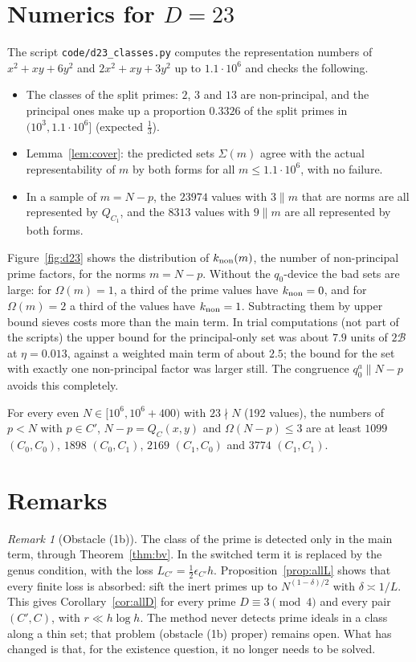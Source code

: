 \documentclass[11pt]{amsart}
\theoremstyle{remark}
\newtheorem{remark}[theorem]{Remark}
\begin{document}
\section{Numerics for \texorpdfstring{$D=23$}{D=23}}\label{sec:d23}
The script \texttt{code/d23\_classes.py} computes the representation numbers of $x^2+xy+6y^2$ and $2x^2+xy+3y^2$ up to $1.1\cdot10^6$ and checks the following.
\begin{itemize}[leftmargin=1.5em]
\item The classes of the split primes: $2$, $3$ and $13$ are non-principal, and the principal ones make up a proportion $0.3326$ of the split primes in $(10^3,1.1\cdot10^6]$ (expected $\frac13$).
\item Lemma~\ref{lem:cover}: the predicted sets $\Sigma(m)$ agree with the actual representability of $m$ by both forms for all $m\le1.1\cdot10^6$, with no failure.
\item In a sample of $m=N-p$, the $23974$ values with $3\parallel m$ that are norms are all represented by $Q_{C_1}$, and the $8313$ values with $9\parallel m$ are all represented by both forms.
\end{itemize}
Figure~\ref{fig:d23} shows the distribution of $k_{\rm non}(m)$, the number of non-principal prime factors, for the norms $m=N-p$. Without the $q_0$-device the bad sets are large: for $\Omega(m)=1$, a third of the prime values have $k_{\rm non}=0$, and for $\Omega(m)=2$ a third of the values have $k_{\rm non}=1$. Subtracting them by upper bound sieves costs more than the main term. In trial computations (not part of the scripts) the upper bound for the principal-only set was about $7.9$ units of $2\mathcal B$ at $\eta=0.013$, against a weighted main term of about $2.5$; the bound for the set with exactly one non-principal factor was larger still. The congruence $q_0^a\parallel N-p$ avoids this completely.

For every even $N\in[10^6,10^6+400)$ with $23\nmid N$ (192 values), the numbers of $p<N$ with $p\in C'$, $N-p=Q_C(x,y)$ and $\Omega(N-p)\le3$ are at least $1099$ $(C_0,C_0)$, $1898$ $(C_0,C_1)$, $2169$ $(C_1,C_0)$ and $3774$ $(C_1,C_1)$.

\section{Remarks}\label{sec:remarks}
\begin{remark}[Obstacle (1b)]
The class of the prime is detected only in the main term, through Theorem~\ref{thm:bv}. In the switched term it is replaced by the genus condition, with the loss $L_{C'}=\frac12\epsilon_{C'}h$. Proposition~\ref{prop:allL} shows that every finite loss is absorbed: sift the inert primes up to $N^{(1-\delta)/2}$ with $\delta\asymp1/L$. This gives Corollary~\ref{cor:allD} for every prime $D\equiv3\pmod4$ and every pair $(C',C)$, with $r\ll h\log h$. The method never detects prime ideals in a class along a thin set; that problem (obstacle (1b) proper) remains open. What has changed is that, for the existence question, it no longer needs to be solved.
\end{remark}
\end{document}
